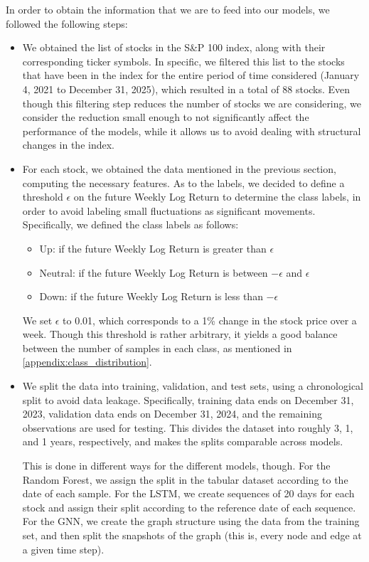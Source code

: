 \documentclass{article}
\begin{document}
In order to obtain the information that we are to feed into our models, we followed the following steps:
\begin{itemize}
    \item We obtained the list of stocks in the S\&P 100 index, along with their corresponding ticker symbols. In specific, we filtered this list to the stocks that have been in the index for the entire period of time considered (January 4, 2021 to December 31, 2025), which resulted in a total of 88 stocks. Even though this filtering step reduces the number of stocks we are considering, we consider the reduction small enough to not significantly affect the performance of the models, while it allows us to avoid dealing with structural changes in the index.
    \item For each stock, we obtained the data mentioned in the previous section, computing the necessary features. As to the labels, we decided to define a threshold $\epsilon$ on the future Weekly Log Return to determine the class labels, in order to avoid labeling small fluctuations as significant movements. Specifically, we defined the class labels as follows:
          \begin{itemize}
              \item Up: if the future Weekly Log Return is greater than $\epsilon$
              \item Neutral: if the future Weekly Log Return is between $-\epsilon$ and $\epsilon$
              \item Down: if the future Weekly Log Return is less than $-\epsilon$
          \end{itemize}
          We set $\epsilon$ to 0.01, which corresponds to a 1\% change in the stock price over a week. Though this threshold is rather arbitrary, it yields a good balance between the number of samples in each class, as mentioned in \ref{appendix:class_distribution}.
    \item We split the data into training, validation, and test sets, using a chronological split to avoid data leakage. Specifically, training data ends on December 31, 2023, validation data ends on December 31, 2024, and the remaining observations are used for testing. This divides the dataset into roughly 3, 1, and 1 years, respectively, and makes the splits comparable across models.

          This is done in different ways for the different models, though. For the Random Forest, we assign the split in the tabular dataset according to the date of each sample. For the LSTM, we create sequences of 20 days for each stock and assign their split according to the reference date of each sequence. For the GNN, we create the graph structure using the data from the training set, and then split the snapshots of the graph (this is, every node and edge at a given time step).
\end{itemize}
\end{document}
